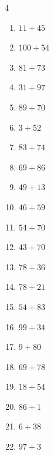 \begin{multicols}{4}
\begin{enumerate}
  \item $11+45$
        \phantom{$=56$}

  \item $100+54$
        \phantom{$=154$}

  \item $81+73$
        \phantom{$=154$}

  \item $31+97$
        \phantom{$=128$}

  \item $89+70$
        \phantom{$=159$}

  \item $3+52$
        \phantom{$=55$}

  \item $83+74$
        \phantom{$=157$}

  \item $69+86$
        \phantom{$=155$}

  \item $49+13$
        \phantom{$=62$}

  \item $46+59$
        \phantom{$=105$}

  \item $54+70$
        \phantom{$=124$}

  \item $43+70$
        \phantom{$=113$}

  \item $78+36$
        \phantom{$=114$}

  \item $78+21$
        \phantom{$=99$}

  \item $54+83$
        \phantom{$=137$}

  \item $99+34$
        \phantom{$=133$}

  \item $9+80$
        \phantom{$=89$}

  \item $69+78$
        \phantom{$=147$}

  \item $18+54$
        \phantom{$=72$}

  \item $86+1$
        \phantom{$=87$}

  \item $6+38$
        \phantom{$=44$}

  \item $97+3$
        \phantom{$=100$}


\end{enumerate}
\end{multicols}
